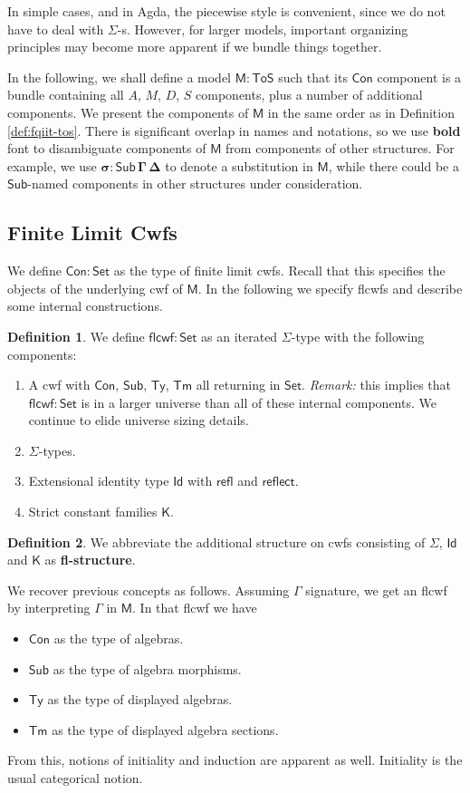 \documentclass[12pt,a4paper,twoside,openany]{book}
\theoremstyle{remark}
\theoremstyle{definition}
\newtheorem{mydefinition}{Definition}
\theoremstyle{theorem}
\newcommand{\bs}[1]{\boldsymbol{#1}}
\newcommand{\refl}{\mathsf{refl}}
\newcommand{\reflect}{\mathsf{reflect}}
\newcommand{\Con}{\mathsf{Con}}
\newcommand{\Sub}{\mathsf{Sub}}
\newcommand{\Tm}{\mathsf{Tm}}
\newcommand{\Ty}{\mathsf{Ty}}
\newcommand{\Id}{\mathsf{Id}}
\newcommand{\Set}{\mathsf{Set}}
\newcommand{\ToS}{\mathsf{ToS}}
\newcommand{\flcwf}{\mathsf{flcwf}}
\newcommand{\K}{\mathsf{K}}
\newcommand{\bCon}{\bs{\Con}}
\newcommand{\bM}{\bs{\mathsf{M}}}
\begin{document}
In simple cases, and in Agda, the piecewise style is convenient, since we do not
have to deal with $\Sigma$-s. However, for larger models, important organizing
principles may become more apparent if we bundle things together.

In the following, we shall define a model $\bM : \ToS$ such that its $\Con$
component is a bundle containing all $A$, $M$, $D$, $S$ components, plus a
number of additional components. We present the components of $\bM$ in the same
order as in Definition \ref{def:fqiit-tos}. There is significant overlap in
names and notations, so we use \textbf{bold} font to disambiguate components of
$\bM$ from components of other structures. For example, we use $\bs{\sigma :
  \Sub\,\Gamma\,\Delta}$ to denote a substitution in $\bM$, while there could be
a $\Sub$-named components in other structures under consideration.

\subsection{Finite Limit Cwfs}

We define $\bCon : \Set$ as the type of finite limit cwfs. Recall that this
specifies the objects of the underlying cwf of $\bM$. In the following we
specify flcwfs and describe some internal constructions.

\begin{mydefinition}\label{def:flcwf}
We define $\flcwf : \Set$ as an iterated $\Sigma$-type with the following components:
\begin{enumerate}
  \item A cwf with $\Con$, $\Sub$, $\Ty$, $\Tm$ all returning in $\Set$. \emph{Remark:}
        this implies that $\flcwf : \Set$ is in a larger universe than all of these
        internal components. We continue to elide universe sizing details.
  \item $\Sigma$-types.
  \item Extensional identity type $\Id$ with $\refl$ and $\reflect$.
  \item Strict constant families $\K$.
\end{enumerate}
\end{mydefinition}
\begin{mydefinition}
We abbreviate the additional structure on cwfs consisting of $\Sigma$, $\Id$ and
$\K$ as \textbf{fl-structure}.
\end{mydefinition}

We recover previous concepts as follows. Assuming $\Gamma$ signature, we get an
flcwf by interpreting $\Gamma$ in $\bM$. In that flcwf we have
\begin{itemize}
  \item $\Con$ as the type of algebras.
  \item $\Sub$ as the type of algebra morphisms.
  \item $\Ty$ as the type of displayed algebras.
  \item $\Tm$ as the type of displayed algebra sections.
\end{itemize}
From this, notions of initiality and induction are apparent as well. Initiality
is the usual categorical notion.
\end{document}
